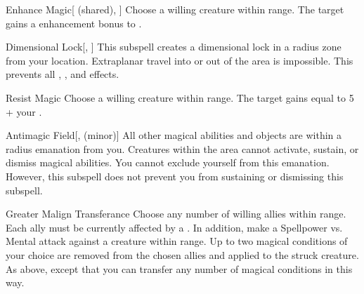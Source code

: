 \begin{ability}[\nth{4}]{Enhance Magic}[ (shared), ]
Choose a willing creature within \rngmed range.
The target gains a  enhancement bonus to .
\end{ability}
\vspace{0.25em}


\begin{ability}[\nth{5}]{Dimensional Lock}[, ]
This subspell creates a dimensional lock in a \arealarge radius zone from your location.
Extraplanar travel into or out of the area is impossible.
This prevents all , , and  effects.
\end{ability}
\vspace{0.25em}


\begin{ability}[\nth{6}]{Resist Magic}
Choose a willing creature within \rngmed range.
The target gains  equal to 5 + your .
\end{ability}
\vspace{0.25em}


\begin{ability}[\nth{7}]{Antimagic Field}[,  (minor)]
All other magical abilities and objects are  within a \areasmall radius emanation from you.
Creatures within the area cannot activate, sustain, or dismiss magical abilities.
You cannot exclude yourself from this emanation.
However, this subspell does not prevent you from sustaining or dismissing this subspell.
\end{ability}
\vspace{0.25em}


\begin{ability}[\nth{7}]{Greater Malign Transferance}
Choose any number of willing allies within \rngmed range.
Each ally must be currently affected by a  .
In addition, make a Spellpower vs. Mental attack against a creature within \rngmed range.
\hit Up to two magical conditions of your choice are removed from the chosen allies and applied to the struck creature.
\crit As above, except that you can transfer any number of magical conditions in this way.
\end{ability}
\vspace{0.25em}


